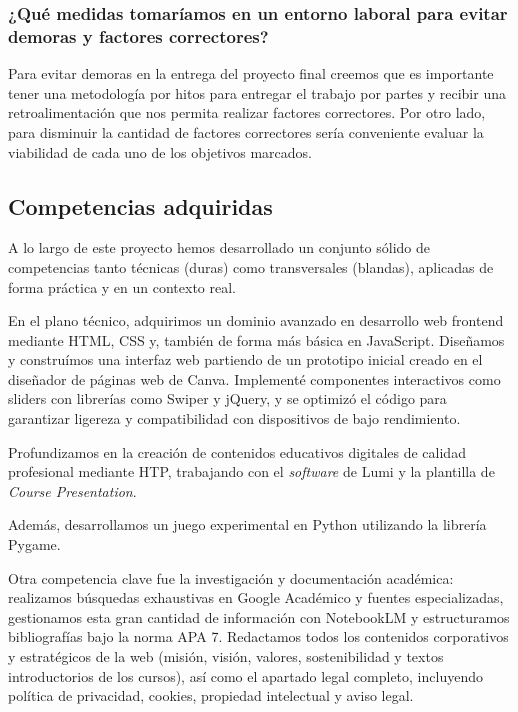 \documentclass[11.5pt]{article}
\begin{document}
	\subsubsection*{¿Qué medidas tomaríamos en un entorno laboral para evitar demoras y factores correctores?}
	
	Para evitar demoras en la entrega del proyecto final creemos que es importante tener una metodología por
	hitos para entregar el trabajo por partes y recibir una retroalimentación que nos permita realizar factores
	correctores. Por otro lado, para disminuir la cantidad de factores correctores sería conveniente evaluar la
	viabilidad de cada uno de los objetivos marcados.


	\subsection{Competencias adquiridas}
	
	A lo largo de este proyecto hemos desarrollado un conjunto sólido de competencias tanto técnicas (duras) como transversales (blandas), aplicadas de forma práctica y en un contexto real.
	
	En el plano técnico, adquirimos un dominio avanzado en desarrollo web frontend mediante HTML, CSS y, también de forma más básica en JavaScript. Diseñamos y construímos una interfaz web partiendo de un prototipo inicial creado en el diseñador de páginas web de Canva. Implementé componentes interactivos como sliders con librerías como Swiper y jQuery, y se optimizó el código para garantizar ligereza y compatibilidad con dispositivos de bajo rendimiento.
	
	Profundizamos en la creación de contenidos educativos digitales de calidad profesional mediante HTP, trabajando con el \textit{software} de Lumi y la plantilla de \textit{Course Presentation}. 
	
	Además, desarrollamos un juego experimental en Python utilizando la librería Pygame.
	
	Otra competencia clave fue la investigación y documentación académica: realizamos búsquedas exhaustivas en Google Académico y fuentes especializadas, gestionamos esta gran cantidad de información con NotebookLM y estructuramos bibliografías bajo la norma APA 7. Redactamos todos los contenidos corporativos y estratégicos de la web (misión, visión, valores, sostenibilidad y textos introductorios de los cursos), así como el apartado legal completo, incluyendo política de privacidad, cookies, propiedad intelectual y aviso legal.
	
\end{document}
